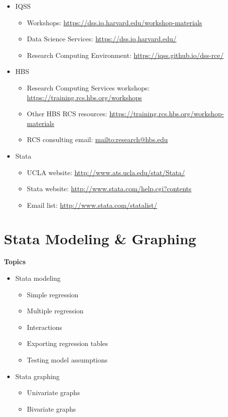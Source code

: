 \documentclass[]{book}
\providecommand{\tightlist}{%
  \setlength{\itemsep}{0pt}\setlength{\parskip}{0pt}}
\begin{document}
\begin{itemize}
\tightlist
\item
  IQSS

  \begin{itemize}
  \tightlist
  \item
    Workshops: \url{https://dss.iq.harvard.edu/workshop-materials}
  \item
    Data Science Services: \url{https://dss.iq.harvard.edu/}
  \item
    Research Computing Environment:
    \url{https://iqss.github.io/dss-rce/}
  \end{itemize}
\item
  HBS

  \begin{itemize}
  \tightlist
  \item
    Research Computing Services workshops:
    \url{https://training.rcs.hbs.org/workshops}
  \item
    Other HBS RCS resources:
    \url{https://training.rcs.hbs.org/workshop-materials}
  \item
    RCS consulting email: \url{mailto:research@hbs.edu}
  \end{itemize}
\item
  Stata

  \begin{itemize}
  \tightlist
  \item
    UCLA website: \url{http://www.ats.ucla.edu/stat/Stata/}
  \item
    Stata website: \url{http://www.stata.com/help.cgi?contents}
  \item
    Email list: \url{http://www.stata.com/statalist/}
  \end{itemize}
\end{itemize}

\chapter{Stata Modeling \& Graphing}\label{stata-modeling-graphing}

\textbf{Topics}

\begin{itemize}
\tightlist
\item
  Stata modeling

  \begin{itemize}
  \tightlist
  \item
    Simple regression
  \item
    Multiple regression
  \item
    Interactions
  \item
    Exporting regression tables
  \item
    Testing model assumptions
  \end{itemize}
\item
  Stata graphing

  \begin{itemize}
  \tightlist
  \item
    Univariate graphs
  \item
    Bivariate graphs
  \end{itemize}
\end{itemize}
\end{document}
